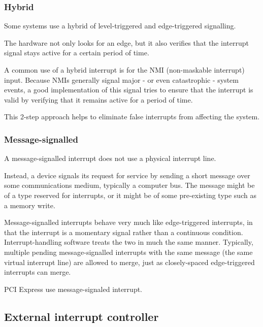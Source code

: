 \begin{frame}
  \frametitle{Hybrid}

Some systems use a hybrid of level-triggered and edge-triggered signalling.

\-

The hardware not only looks for an edge, but it also verifies that the interrupt signal stays active for a certain period of time.

\-

A common use of a hybrid interrupt is for the NMI (non-maskable interrupt) input. Because NMIs generally signal major - or even catastrophic - system events, a good implementation of this signal tries to ensure that the interrupt is valid by verifying that it remains active for a period of time.

\-

This 2-step approach helps to eliminate false interrupts from affecting the system.


\end{frame}


\begin{frame}
  \frametitle{Message-signalled}

A message-signalled interrupt does not use a physical interrupt line.

\-

Instead, a device signals its request for service by sending a short message over some communications medium, typically a computer bus. The message might be of a type reserved for interrupts, or it might be of some pre-existing type such as a memory write.

\-

Message-signalled interrupts behave very much like edge-triggered interrupts, in that the interrupt is a momentary signal rather than a continuous condition. Interrupt-handling software treats the two in much the same manner. Typically, multiple pending message-signalled interrupts with the same message (the same virtual interrupt line) are allowed to merge, just as closely-spaced edge-triggered interrupts can merge.

\-

PCI Express use message-signaled interrupt.

\end{frame}

\subsection{External interrupt controller}

